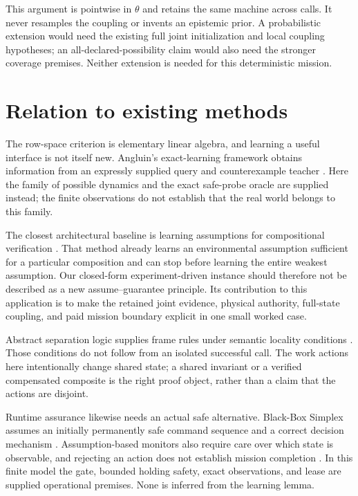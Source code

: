 \documentclass[11pt,a4paper]{article}
\theoremstyle{definition}
\begin{document}
This argument is pointwise in $\theta$ and retains the same machine across
calls. It never resamples the coupling or invents an epistemic prior. A
probabilistic extension would need the existing full joint initialization
and local coupling hypotheses; an all-declared-possibility claim would
also need the stronger coverage premises. Neither extension is needed for
this deterministic mission.


\section{Relation to existing methods}

The row-space criterion is elementary linear algebra, and learning a useful
interface is not itself new. Angluin's exact-learning framework obtains
information from an expressly supplied query and counterexample teacher
\cite{Angluin}. Here the family of possible dynamics and the exact safe-probe
oracle are supplied instead; the finite observations do not establish that
the real world belongs to this family.

The closest architectural baseline is learning assumptions for compositional
verification \cite{Cobleigh}. That method already learns an environmental
assumption sufficient for a particular composition and can stop before
learning the entire weakest assumption. Our closed-form experiment-driven
instance should therefore not be described as a new assume--guarantee
principle. Its contribution to this application is to make the retained
joint evidence, physical authority, full-state coupling, and paid mission
boundary explicit in one small worked case.

Abstract separation logic supplies frame rules under semantic locality
conditions \cite{LocalAction}. Those conditions do not follow from an
isolated successful call. The work actions here intentionally change shared
state; a shared invariant or a verified compensated composite is the right
proof object, rather than a claim that the actions are disjoint.

Runtime assurance likewise needs an actual safe alternative.
Black-Box Simplex assumes an initially permanently safe command sequence
and a correct decision mechanism \cite{Simplex}. Assumption-based monitors
also require care over which state is observable, and rejecting an action
does not establish mission completion \cite{Assumptions}. In this finite
model the gate, bounded holding safety, exact observations, and lease are
supplied operational premises. None is inferred from the learning lemma.
\end{document}
